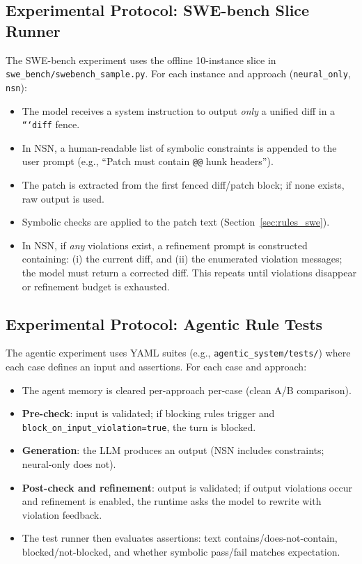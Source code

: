 \documentclass[conference]{IEEEtran}
\begin{document}
\subsection{Experimental Protocol: SWE-bench Slice Runner}
The SWE-bench experiment uses the offline 10-instance slice in \texttt{swe\_bench/swebench\_sample.py}. For each instance and approach (\texttt{neural\_only}, \texttt{nsn}):
\begin{itemize}
  \item The model receives a system instruction to output \emph{only} a unified diff in a \texttt{```diff} fence.
  \item In NSN, a human-readable list of symbolic constraints is appended to the user prompt (e.g., ``Patch must contain \texttt{@@} hunk headers'').
  \item The patch is extracted from the first fenced diff/patch block; if none exists, raw output is used.
  \item Symbolic checks are applied to the patch text (Section~\ref{sec:rules_swe}).
  \item In NSN, if \emph{any} violations exist, a refinement prompt is constructed containing: (i) the current diff, and (ii) the enumerated violation messages; the model must return a corrected diff. This repeats until violations disappear or refinement budget is exhausted.
\end{itemize}

\subsection{Experimental Protocol: Agentic Rule Tests}
The agentic experiment uses YAML suites (e.g., \texttt{agentic\_system/tests/}) where each case defines an input and assertions. For each case and approach:
\begin{itemize}
  \item The agent memory is cleared per-approach per-case (clean A/B comparison).
  \item \textbf{Pre-check}: input is validated; if blocking rules trigger and \texttt{block\_on\_input\_violation=true}, the turn is blocked.
  \item \textbf{Generation}: the LLM produces an output (NSN includes constraints; neural-only does not).
  \item \textbf{Post-check and refinement}: output is validated; if output violations occur and refinement is enabled, the runtime asks the model to rewrite with violation feedback.
  \item The test runner then evaluates assertions: text contains/does-not-contain, blocked/not-blocked, and whether symbolic pass/fail matches expectation.
\end{itemize}
\end{document}
